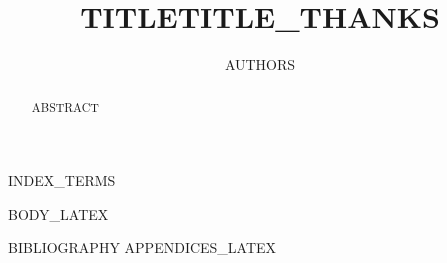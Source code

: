 \documentclass[conference]{IEEEtran}
\title{{{TITLE}}{{TITLE_THANKS}}}
\author{{{AUTHORS}}}
\begin{document}
\maketitle

\begin{abstract}
{{ABSTRACT}}
\end{abstract}

\begin{IEEEkeywords}
{{INDEX_TERMS}}
\end{IEEEkeywords}

{{BODY_LATEX}}

{{BIBLIOGRAPHY}}
{{APPENDICES_LATEX}}
\end{document}
